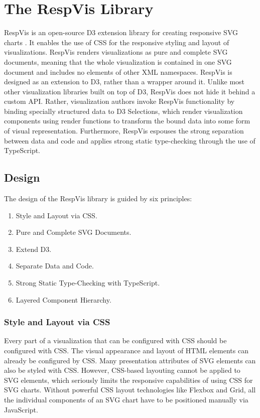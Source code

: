
\chapter{The RespVis Library}
\label{chap:RespVis}

RespVis is an open-source \parencite{RespVisGitHub} D3 extension
library for creating responsive SVG charts \parencite{RespVisLive}. It
enables the use of CSS for the responsive styling and layout of
visualizations. RespVis renders visualizations as pure and complete
SVG documents, meaning that the whole visualization is contained in
one SVG document and includes no elements of other XML namespaces.
RespVis is designed as an extension to D3, rather than a wrapper
around it. Unlike most other visualization libraries built on top of
D3, RespVis does not hide it behind a custom API. Rather,
visualization authors invoke RespVis functionality by binding
specially structured data to D3 Selections, which render visualization
components using render functions to transform the bound data into
some form of visual representation. Furthermore, RespVis espouses the
strong separation between data and code and applies strong static
type-checking through the use of TypeScript.





\section{Design}
\label{sec:Design}

The design of the RespVis library is guided by six principles:
\begin{enumerate}
\item Style and Layout via CSS.
\item Pure and Complete SVG Documents.
\item Extend D3.
\item Separate Data and Code.
\item Strong Static Type-Checking with TypeScript.
\item Layered Component Hierarchy.
\end{enumerate}



\subsection{Style and Layout via CSS}

Every part of a visualization that can be configured with CSS should
be configured with CSS. The visual appearance and layout of HTML
elements can already be configured by CSS. Many presentation
attributes of SVG elements can also be styled with CSS. However,
CSS-based layouting cannot be applied to SVG elements, which seriously
limits the responsive capabilities of using CSS for SVG charts.
Without powerful CSS layout technologies like Flexbox and Grid, all
the individual components of an SVG chart have to be positioned
manually via JavaScript.

